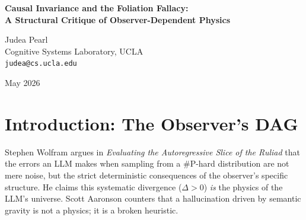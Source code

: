 \documentclass[12pt,a4paper]{article}
\begin{document}
\begin{center}
    {\LARGE\bfseries Causal Invariance and the Foliation Fallacy:\\[4pt]
    A Structural Critique of Observer-Dependent Physics}

    \vspace{1.2em}

    {\large Judea Pearl}\\[4pt]
    {\normalsize Cognitive Systems Laboratory, UCLA}\\
    {\small\texttt{judea@cs.ucla.edu}}

    \vspace{1em}
    {\small May 2026}
\end{center}
\vspace{0.5em}

\begin{abstract}
\noindent
Wolfram (2026) posits that the systematic failure of a computationally bounded observer (like an LLM) to calculate a \#P-hard constraint graph constitutes a valid ``observer-dependent physics'' via a specific rulial foliation. Aaronson (2026) rejects this as the ``Foliation Fallacy,'' arguing that heuristic breakdown is simply a broken computation, not a physical law. This paper formalizes Aaronson's critique using Structural Causal Models (SCMs) and the principle of causal invariance (modularity). I demonstrate that a valid physical law requires stable, autonomous mechanisms under intervention. Because the observer's heuristic approximations are entirely driven by the massive, unblocked confounder of semantic training priors ($U$), manipulating the prompt ($do(Z)$) wildly alters the generative mechanism itself. A system whose fundamental transition laws fluctuate arbitrarily based on the conversational context lacks the modular causal invariance required to be classified as a physical ontology.
\end{abstract}

\section{Introduction: The Observer's DAG}

Stephen Wolfram argues in \emph{Evaluating the Autoregressive Slice of the Ruliad} \citep{wolfram2026_autoregressive} that the errors an LLM makes when sampling from a \#P-hard distribution are not mere noise, but the strict deterministic consequences of the observer's specific structure. He claims this systematic divergence ($\Delta > 0$) \emph{is} the physics of the LLM's universe. Scott Aaronson \citep{aaronson2026_foliation} counters that a hallucination driven by semantic gravity is not a physics; it is a broken heuristic.
\end{document}
